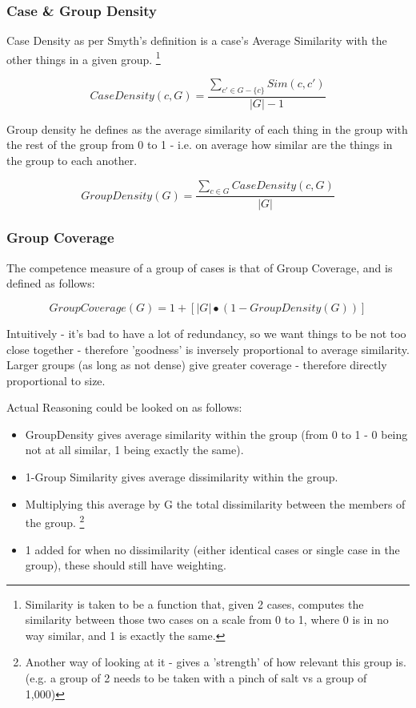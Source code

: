 \documentclass[a4paper,11pt]{report}
\begin{document}
\subsubsection{Case \& Group Density}

Case Density as per Smyth's definition is a case's Average Similarity with the other things in a given group. \footnote{Similarity is taken to be a function that, given 2 cases, computes the similarity between those two cases on a scale from 0 to 1, where 0 is in no way similar, and 1 is exactly the same.}

\[
CaseDensity(c,G)=\frac{\underset{c'\in G-\{c\}}{\sum}Sim(c,c')}{\left|G\right|-1}
\]

Group density he defines as the average similarity of each thing in the group with the rest of the group from 0 to 1 - i.e. on average how similar are the things in the group to each another.

\[
GroupDensity(G)=\frac{\underset{c\in G}{\sum}CaseDensity(c,G)}{\left|G\right|}
\]

\subsubsection{Group Coverage}
The competence measure of a group of cases is that of Group Coverage, and is defined as follows:

\[
GroupCoverage(G)=1+\left[\left|G\right|\bullet(1-GroupDensity(G))\right]
\]

Intuitively - it's bad to have a lot of redundancy, so we want things to be not too close together - therefore 'goodness' is inversely proportional to average similarity. Larger groups (as long as not dense) give greater coverage - therefore directly proportional to size.

Actual Reasoning could be looked on as follows:
\begin{itemize}
	\item GroupDensity gives average similarity within the group (from 0 to 1 - 0 being not at all similar, 1 being exactly the same).
	\item 1-Group Similarity gives average dissimilarity within the group.
	\item Multiplying this average by G the total dissimilarity between the members of the group. \footnote{Another way of looking at it - gives a 'strength' of how relevant this group is. (e.g. a group of 2 needs to be taken with a pinch of salt vs a group of 1,000)}
	\item 1 added for when no dissimilarity (either identical cases or single case in the group), these should still have weighting.
\end{itemize}
\end{document}
